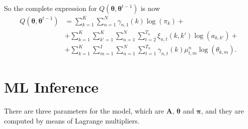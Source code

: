 \documentclass[12pt]{article}
\newcommand{\bs}{\boldsymbol}
\begin{document}
So the complete expression for $Q \left( \boldsymbol { \theta } , \boldsymbol { \theta } ^ { t - 1 } \right)$ is now
\begin{equation}
\begin{split}
Q \left( \boldsymbol { \theta } , \boldsymbol { \theta } ^ { t - 1 } \right) &= \sum\limits_{k=1}^{K}\sum _ { n = 1 } ^ { N } \gamma _ { n , 1 } ( k ) \log(\pi_{k}) + \\
&+ \sum\limits_{k=1}^{K}\sum\limits_{k'=1}^{K}\sum _ { n = 1 } ^ { N } \sum _ { t = 2 } ^ { T _ { n } } \xi _ { n , t } ( k , k' ) \log(a_{k,k'}) + \\
&+ \sum\limits_{k=1}^{K}\sum\limits_{m=1}^{I}\sum _ { n = 1 } ^ { N } \sum _ { t = 1 } ^ { T _ { n } } \gamma _ { n , t } ( k )\mu^{n}_{t,m} \log(\theta_{k,m}).
\end{split}
\end{equation}
\section{ML Inference}
There are three parameters for the model, which are $\mathbf{A}$, $\bs\theta$ and $\bs\pi$, and they are computed by means of Lagrange multipliers.
\end{document}
